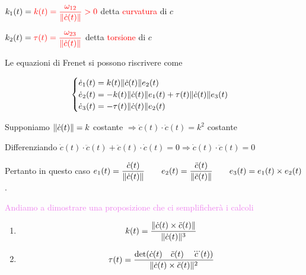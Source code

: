         $\displaystyle k_1(t) = \textcolor{red}{k(t) = \frac{\omega_{12}}{\lVert\dot{c}(t)\rVert}>0}$ detta \textcolor{red}{curvatura} di $c$

        $\displaystyle k_2(t) = \textcolor{red}{\tau(t) = \frac{\omega_{23}}{\lVert\dot{c}(t)\rVert}}$ detta \textcolor{red}{torsione} di $c$

        Le equazioni di Frenet si possono riscrivere come 

        \begin{equation}\label{eq:equazioni_di_Frenet_per_curve_nello_spazio}
        \begin{cases}
            \dot{e}_1(t) = k(t) \lVert\dot{c}(t)\rVert e_2(t) \\
            \dot{e}_2(t) = -k(t) \lVert\dot{c}(t)\rVert e_1(t) + \tau(t) \lVert\dot{c}(t)\rVert e_3(t) \\
            \dot{e}_3(t) = -\tau(t) \lVert\dot{c}(t)\rVert e_2(t)
        \end{cases}
        \end{equation}
        \begin{osservazione}
        Supponiamo $\lVert\dot{c}(t)\rVert=k$ costante $\Rightarrow \dot{c}(t) \cdot \dot{c}(t)=k^2$ costante
        
        Differenziando 
        $\dot{c}(t) \cdot \ddot{c}(t) + \ddot{c}(t) \cdot \dot{c}(t) = 0 \Rightarrow \dot{c}(t) \cdot \ddot{c}(t) = 0$

        Pertanto in questo caso $\displaystyle e_1(t) = \frac{\dot{c}(t)}{\lVert\dot{c}(t)\rVert} \qquad e_2(t) = \frac{\ddot{c}(t)}{\lVert\ddot{c}(t)\rVert} \qquad e_3(t) = e_1(t) \times e_2(t)$.
        \end{osservazione}
        \newpage
        \textcolor{violet}{Andiamo a dimostrare una proposizione che ci semplificherà i calcoli}
        \begin{proposizione}
        \mbox{}

        \begin{enumerate}
            \item 
            \begin{equation}
            \label{eq:curvatura_nello_spazio}
            k(t)= \frac{\lVert\dot{c}(t) \times \ddot{c}(t)\rVert}{\lVert\dot{c}(t)\rVert^3}
            \end{equation}
            \item 
            \begin{equation}
            \label{eq:torsione}    
            \tau(t) = \frac{ \det(\dot{c}(t) \quad \ddot{c}(t) \quad \dddot{c}(t)) }{\lVert\dot{c}(t) \times \ddot{c}(t)\rVert^2} 
            \end{equation}
        \end{enumerate}
        \end{proposizione}
